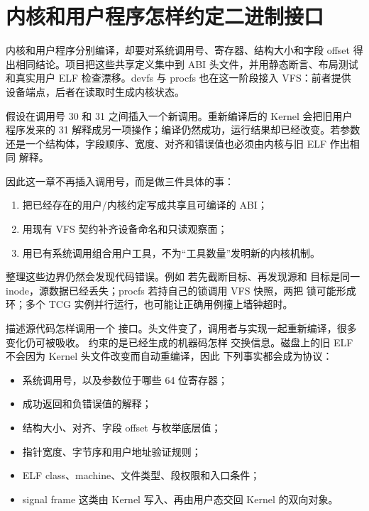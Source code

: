 \section{内核和用户程序怎样约定二进制接口}

内核和用户程序分别编译，却要对系统调用号、寄存器、结构大小和字段 offset
得出相同结论。项目把这些共享定义集中到 ABI 头文件，并用静态断言、布局测试
和真实用户 ELF 检查漂移。devfs 与 procfs 也在这一阶段接入 VFS：前者提供
设备端点，后者在读取时生成内核状态。

假设在调用号 30 和 31 之间插入一个新调用。重新编译后的 Kernel 会把旧用户
程序发来的 31 解释成另一项操作；编译仍然成功，运行结果却已经改变。若参数
还是一个结构体，字段顺序、宽度、对齐和错误值也必须由内核与旧 ELF 作出相同
解释。

因此这一章不再插入调用号，而是做三件具体的事：

\begin{enumerate}[leftmargin=2.1em]
  \item 把已经存在的用户/内核约定写成共享且可编译的 ABI；
  \item 用现有 VFS 契约补齐设备命名和只读观察面；
  \item 用已有系统调用组合用户工具，不为“工具数量”发明新的内核机制。
\end{enumerate}

整理这些边界仍然会发现代码错误。例如  若先截断目标、再发现源和
目标是同一 inode，源数据已经丢失；procfs 若持自己的锁调用 VFS 快照，两把
锁可能形成环；多个 TCG 实例并行运行，也可能让正确用例撞上墙钟超时。

描述源代码怎样调用一个
接口。头文件变了，调用者与实现一起重新编译，很多变化仍可被吸收。
约束的是已经生成的机器码怎样
交换信息。磁盘上的旧 ELF 不会因为 Kernel 头文件改变而自动重编译，因此
下列事实都会成为协议：

\begin{itemize}[leftmargin=2em]
  \item 系统调用号，以及参数位于哪些 64 位寄存器；
  \item 成功返回和负错误值的解释；
  \item 结构大小、对齐、字段 offset 与枚举底层值；
  \item 指针宽度、字节序和用户地址验证规则；
  \item ELF class、machine、文件类型、段权限和入口条件；
  \item signal frame 这类由 Kernel 写入、再由用户态交回 Kernel 的双向对象。
\end{itemize}

